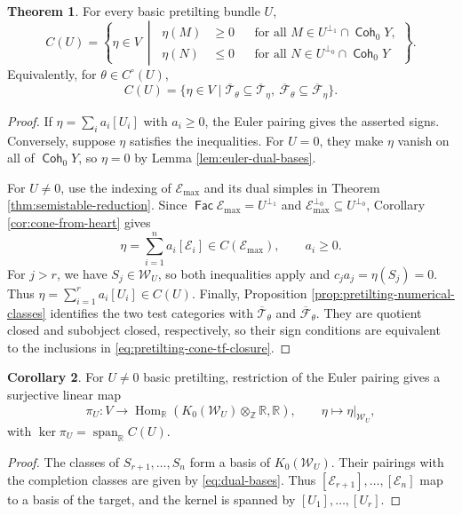 \documentclass[a4paper,reqno]{amsart}
\def\E{\mathcal{E}}
\def\F{\mathcal{F}}
\def\T{\mathcal{T}}
\def\W{\mathcal{W}}
\DeclareMathOperator{\Fac}{\mathsf{Fac}}
\DeclareMathOperator{\Coh}{\mathsf{Coh}}
\DeclareMathOperator{\Hom}{Hom}
\theoremstyle{definition}
\newtheorem{Thm}{Theorem}[section]
\newtheorem{Cor}[Thm]{Corollary}
\begin{document}
\begin{Thm}\label{thm:pretilting-cone-inequalities}
For every basic pretilting bundle $U$,
\begin{equation}\label{eq:pretilting-cone-inequalities}
C(U)=\left\{\eta\in V\ \middle|\
\begin{aligned}
\eta(M)&\ge0&&\text{for all }M\in U^{\perp_1}\cap\Coh_0Y,\\
\eta(N)&\le0&&\text{for all }N\in U^{\perp_0}\cap\Coh_0Y
\end{aligned}\right\}.
\end{equation}
Equivalently, for $\theta\in C^\circ(U)$,
\begin{equation}\label{eq:pretilting-cone-tf-closure}
C(U)=\{\eta\in V\mid
\overline{\T}_\theta\subseteq\overline{\T}_\eta,\
\overline{\F}_\theta\subseteq\overline{\F}_\eta\}.
\end{equation}
\end{Thm}
\begin{proof}
If $\eta=\sum_i a_i[U_i]$ with $a_i\ge0$, the Euler pairing gives the asserted signs. Conversely, suppose $\eta$ satisfies the inequalities. For $U=0$, they make $\eta$ vanish on all of $\Coh_0Y$, so $\eta=0$ by Lemma \ref{lem:euler-dual-bases}.

For $U\ne0$, use the indexing of $\E_{\max}$ and its dual simples in Theorem \ref{thm:semistable-reduction}. Since $\Fac\E_{\max}=U^{\perp_1}$ and $\E_{\max}^{\perp_0}\subseteq U^{\perp_0}$, Corollary \ref{cor:cone-from-heart} gives
\[
\eta=\sum_{i=1}^n a_i[\E_i]\in C(\E_{\max}),\qquad a_i\ge0.
\]
For $j>r$, we have $S_j\in\W_U$, so both inequalities apply and $c_ja_j=\eta(S_j)=0$. Thus $\eta=\sum_{i=1}^r a_i[U_i]\in C(U)$.
Finally, Proposition \ref{prop:pretilting-numerical-classes} identifies the two test categories with $\overline{\T}_\theta$ and $\overline{\F}_\theta$. They are quotient closed and subobject closed, respectively, so their sign conditions are equivalent to the inclusions in \eqref{eq:pretilting-cone-tf-closure}.
\end{proof}

\begin{Cor}\label{cor:semistable-reduction-map}
For $U\ne0$ basic pretilting, restriction of the Euler pairing gives a surjective linear map
\[
\pi_U\colon V\longrightarrow
\Hom_{\mathbb R}(K_0(\W_U)\otimes_{\mathbb Z}\mathbb R,\mathbb R),
\qquad \eta\longmapsto\eta|_{\W_U},
\]
with $\ker\pi_U=\operatorname{span}_{\mathbb R}C(U)$.
\end{Cor}
\begin{proof}
The classes of $S_{r+1},\ldots,S_n$ form a basis of $K_0(\W_U)$. Their pairings with the completion classes are given by \eqref{eq:dual-bases}. Thus $[\E_{r+1}],\ldots,[\E_n]$ map to a basis of the target, and the kernel is spanned by $[U_1],\ldots,[U_r]$.
\end{proof}
\end{document}
